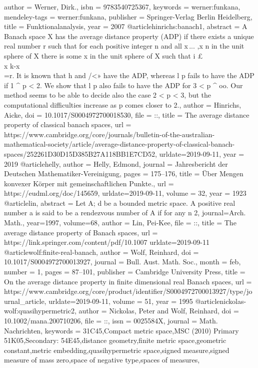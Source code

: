 {{{author = {Werner, Dirk.},
isbn = {9783540725367},
keywords = {werner:funkana},
mendeley-tags = {werner:funkana},
publisher = {Springer-Verlag Berlin Heidelberg},
title = {{Funktionalanalysis}},
year = {2007}
}
@article{hinrichs:banach1,
abstract = {A Banach space X has the average distance property (ADP) if there exists a unique real number r such that for each positive integer n and all x\,... ,x n in the unit sphere of X there is some x in the unit sphere of X such that i {\pounds} \\x k-x\\=r. It is known that h and /<» have the ADP, whereas l p fails to have the ADP if 1 ^ p < 2. We show that l p also fails to have the ADP for 3 < p ^ oo. Our method seems to be able to decide also the case 2 < p < 3, but the computational difficulties increase as p comes closer to 2.},
author = {Hinrichs, Aicke},
doi = {10.1017/S0004972700018530},
file = {::},
title = {{The average distance property of classical banach spaces}},
url = {https://www.cambridge.org/core/journals/bulletin-of-the-australian-mathematical-society/article/average-distance-property-of-classical-banach-spaces/252261D30D15D385B27A118BB1E7CD52},
urldate={2019-09-11},
year = {2019}
}
@article{helly,
author = {Helly, Edmond},
journal = {Jahresbericht der Deutschen Mathematiker-Vereinigung},
pages = {175--176},
title = {{{\"{U}}ber Mengen konvexer K{\"{o}}rper mit gemeinschaftlichen Punkte.}},
url = {https://eudml.org/doc/145659},
urldate={2019-09-11},
volume = {32},
year = {1923}
}
@article{lin,
abstract = {Let A; d be a bounded metric space. A positive real number a is said to be a rendezvous number of A if for any n 2},
journal={Arch. Math.},
year={1997},
volume={68},
author = {Lin, Pei-Kee},
file = {::},
title = {{The average distance property of Banach spaces}},
url = {https://link.springer.com/content/pdf/10.1007%
urldate={2019-09-11}
}
@article{wolf:finite-real-banach,
author = {Wolf, Reinhard},
doi = {10.1017/S0004972700013927},
journal = {Bull. Aust. Math. Soc.},
month = {feb},
number = {1},
pages = {87--101},
publisher = {Cambridge University Press},
title = {{On the average distance property in finite dimensional real Banach spaces}},
url = {https://www.cambridge.org/core/product/identifier/S0004972700013927/type/journal_article},
urldate={2019-09-11},
volume = {51},
year = {1995}
}
@article{nickolas-wolf:quasihypermetric2,
author = {Nickolas, Peter and Wolf, Reinhard},
doi = {10.1002/mana.200710206},
file = {::},
issn = {0025584X},
journal = {Math. Nachrichten},
keywords = {31C45,Compact metric space,MSC (2010) Primary 51K05,Secondary: 54E45,distance geometry,finite metric space,geometric constant,metric embedding,quasihypermetric space,signed measure,signed measure of mass zero,space of negative type,spaces of measures},
}}}}
